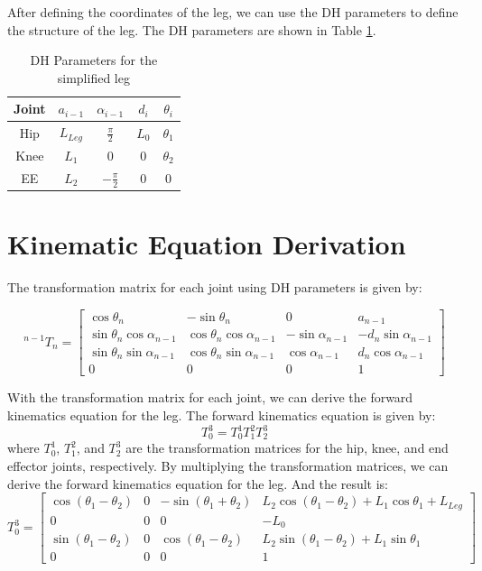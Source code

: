 \documentclass{article}
\begin{document}
After defining the coordinates of the leg, we can use the DH parameters to define the structure of the leg. The DH parameters are shown in Table \ref{tab:dh_parameters}.
\begin{table}[h!]
  \centering
  \small
  \begin{tabular}{|c|c|c|c|c|}
  \hline
  Joint & $a_{i-1}$ & $\alpha_{i-1}$ & $d_i$ & $\theta_i$ \\
  \hline
  Hip & $L_{Leg}$ & $\frac{\pi}{2}$ & $L_{0}$ & $\theta_1$ \\
  Knee & $L_1$ & 0 & $0$ & $\theta_2$ \\
  EE & $L_2$ & $-\frac{\pi}{2}$ & $0$ & 0 \\
  \hline
  \end{tabular}
  \caption{DH Parameters for the simplified leg}
  \label{tab:dh_parameters}
\end{table}
  
\section*{Kinematic Equation Derivation}
The transformation matrix for each joint using DH parameters is given by:

\begin{equation}
  { }^{n-1} T_n=\left[\begin{smallmatrix}
  \cos \theta_n & -\sin \theta_n & 0 & a_{n-1} \\
  \sin \theta_n \cos \alpha_{n-1} & \cos \theta_n \cos \alpha_{n-1} & -\sin \alpha_{n-1} & -d_n \sin \alpha_{n-1} \\
  \sin \theta_n \sin \alpha_{n-1} & \cos \theta_n \sin \alpha_{n-1} & \cos \alpha_{n-1} & d_n \cos \alpha_{n-1} \\
  0 & 0 & 0 & 1
  \end{smallmatrix}\right]
\end{equation}

With the transformation matrix for each joint, we can derive the forward kinematics equation for the leg.
The forward kinematics equation is given by:
\begin{equation}
  T_{0}^{3}=T_{0}^{1} T_{1}^{2} T_{2}^{3}
  \end{equation}
  where $T_{0}^{1}$, $T_{1}^{2}$, and $T_{2}^{3}$ are the transformation matrices for the hip, knee, and end effector joints, respectively.
  By multiplying the transformation matrices, we can derive the forward kinematics equation for the leg.
And the result is:
\begin{equation}
  T_{0}^{3}=\left[\begin{smallmatrix}
  \cos (\theta_1 - \theta_2) & 0 & -\sin (\theta_1 + \theta_2) & L_2 \cos (\theta_1 - \theta_2) + L_1 \cos \theta_1 + L_{Leg} \\
  0 & 0 & 0 & -L_0 \\
  \sin(\theta_1 - \theta_2) & 0 & \cos (\theta_1 - \theta_2) & L_2 \sin (\theta_1 - \theta_2) + L_1 \sin \theta_1 \\
  0 & 0 & 0 & 1
  \end{smallmatrix}\right]
\end{equation}
\end{document}

